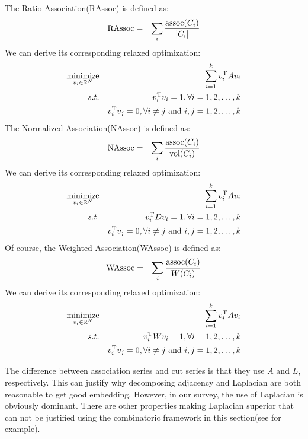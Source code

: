 The Ratio Association(RAssoc) is defined as:
\begin{eqnarray}
	\text{RAssoc} &=& \sum_{i} \frac{ \text{assoc}(C_i)}{|C_i|} 
\end{eqnarray}
We can derive its corresponding relaxed optimization:
\begin{eqnarray}
	\operatorname*{minimize}_{v_i \in \mathbb{R}^N} 
	&& { \sum_{i=1}^{k}{v_i^\mathrm{T}Av_i} } \nonumber \\
	s.t. && v_i^\mathrm{T}v_i = 1, \forall i=1,2,\ldots,k \nonumber \\
		 && v_i^\mathrm{T}v_j = 0, \forall i \ne j \text{~and~} i,j=1,2,\ldots,k\label{eq:rassoc_opt}
\end{eqnarray}
The Normalized Association(NAssoc) is defined as:
\begin{eqnarray}
	\text{NAssoc} &=& \sum_{i} \frac{ \text{assoc}(C_i)}{\text{vol}(C_i)} 
\end{eqnarray}
We can derive its corresponding relaxed optimization:
\begin{eqnarray}
	\operatorname*{minimize}_{v_i \in \mathbb{R}^N} 
	&& { \sum_{i=1}^{k}{v_i^\mathrm{T}Av_i} } \nonumber \\
	s.t. && v_i^\mathrm{T}Dv_i = 1, \forall i=1,2,\ldots,k \nonumber \\
		 && v_i^\mathrm{T}v_j = 0, \forall i \ne j \text{~and~} i,j=1,2,\ldots,k\label{eq:nassoc_opt}
\end{eqnarray}
Of course, the Weighted Association(WAssoc) is defined as:
\begin{eqnarray}
	\text{WAssoc} &=& \sum_{i} \frac{ \text{assoc}(C_i)}{W(C_i)} 
\end{eqnarray}
We can derive its corresponding relaxed optimization:
\begin{eqnarray}
	\operatorname*{minimize}_{v_i \in \mathbb{R}^N} 
	&& { \sum_{i=1}^{k}{v_i^\mathrm{T}Av_i} } \nonumber \\
	s.t. && v_i^\mathrm{T}Wv_i = 1, \forall i=1,2,\ldots,k \nonumber \\
		 && v_i^\mathrm{T}v_j = 0, \forall i \ne j \text{~and~} i,j=1,2,\ldots,k\label{eq:wassoc_opt}
\end{eqnarray}

The difference between association series and cut series is that 
they use $ A $ and $ L $, respectively. This can justify why 
decomposing adjacency and Laplacian are both reasonable to 
get good embedding. However, in our survey, the use of Laplacian 
is obviously dominant. There are other properties making Laplacian 
superior that can not be justified using the combinatoric framework
in this section(see \rsec{\ref{sec:lemap}} for example). 

